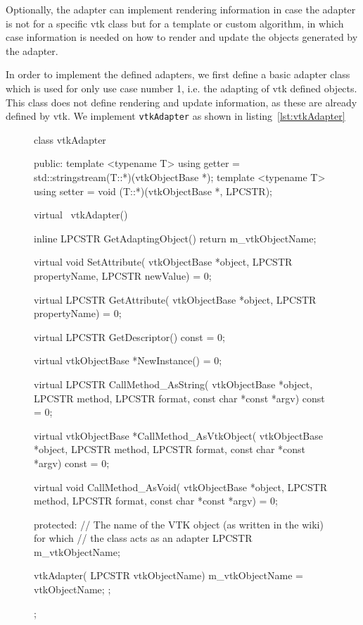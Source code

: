 Optionally, the adapter can implement rendering information in case the adapter is not for a specific \acrshort{vtk} class but for a template or custom algorithm, in which case information is needed on how to render and update the objects generated by the adapter.

In order to implement the defined adapters, we first define a basic adapter class which is used for only use case number 1, i.e. the adapting of \acrshort{vtk} defined objects. This class does not define rendering and update information, as these are already defined by \acrshort{vtk}. We implement \verb|vtkAdapter| as shown in listing~\ref{lst:vtkAdapter}

\begin{figure}[ht!]
    \centering
    \begin{cpp}[label=lst:vtkAdapter,caption={C++ implementation of the vtkAdapter class.}]
class vtkAdapter
{
public:
    template <typename T> using getter = std::stringstream(T::*)(vtkObjectBase *);
    template <typename T> using setter = void (T::*)(vtkObjectBase *, LPCSTR);

    virtual ~vtkAdapter() { }

    inline LPCSTR GetAdaptingObject() 
    {
        return m_vtkObjectName;
    }

    virtual void SetAttribute(
        vtkObjectBase *object,
        LPCSTR propertyName,
        LPCSTR newValue) = 0;

    virtual LPCSTR GetAttribute(
        vtkObjectBase *object,
        LPCSTR propertyName) = 0;

    virtual LPCSTR GetDescriptor() const = 0;

    virtual vtkObjectBase *NewInstance() = 0;

    virtual LPCSTR CallMethod_AsString(
        vtkObjectBase *object,
        LPCSTR method,
        LPCSTR format,
        const char *const *argv) const = 0;

    virtual vtkObjectBase *CallMethod_AsVtkObject(
        vtkObjectBase *object,
        LPCSTR method,
        LPCSTR format,
        const char *const *argv) const = 0;

    virtual void CallMethod_AsVoid(
        vtkObjectBase *object,
        LPCSTR method,
        LPCSTR format,
        const char *const *argv) = 0;

protected:
    // The name of the VTK object (as written in the wiki) for which
    // the class acts as an adapter
    LPCSTR m_vtkObjectName;

    vtkAdapter(
        LPCSTR vtkObjectName) 
    { 
        m_vtkObjectName = vtkObjectName;
    };
};
    \end{cpp}
\end{figure}


